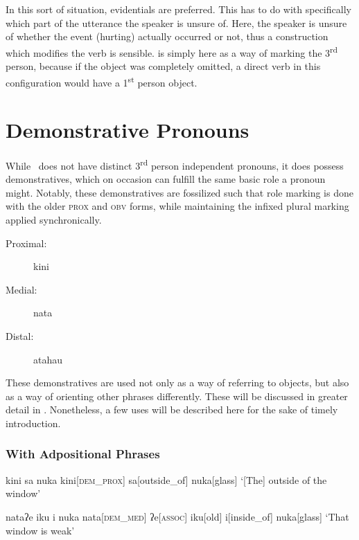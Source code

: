 In this sort of situation, evidentials are preferred.
This has to do with specifically which part of the utterance the speaker is unsure of.
Here, the speaker is unsure of whether the event (hurting) actually occurred or not, thus a construction which modifies the verb is sensible.
 is simply here as a way of marking the 3\textsuperscript{rd} person, because if the object was completely omitted, a direct verb in this configuration would have a 1\textsuperscript{st} person object.

\section{Demonstrative Pronouns}
While \langname\ does not have distinct 3\textsuperscript{rd} person independent pronouns, it does possess demonstratives, which on occasion can fulfill the same basic role a pronoun might.
Notably, these demonstratives are fossilized such that role marking is done with the older \textsc{prox} and \textsc{obv} forms, while maintaining the infixed plural marking applied synchronically.
\begin{description}
  \item[Proximal:] kini
  \item[Medial:] nata
  \item[Distal:] atahau
\end{description}


These demonstratives are used not only as a way of referring to  objects, but also as a way of orienting other phrases differently.
These will be discussed in greater detail in .
Nonetheless, a few uses will be described here for the sake of timely introduction.

\subsubsection{With Adpositional Phrases}

\ex
\begingl
\glpreamble kini sa nuka
\endpreamble
kini[\textsc{dem\_prox}]
sa[outside\_of]
nuka[glass]
\glft `[The] outside of the window'
\endgl
\xe

\ex
\begingl
\glpreamble nataʔe iku i nuka
\endpreamble
nata[\textsc{dem\_med}]
ʔe[\textsc{assoc}]
iku[old]
i[inside\_of]
nuka[glass]
\glft `That window is weak'
\endgl
\xe
